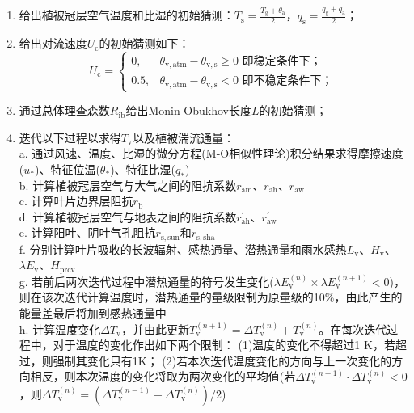 \begin{enumerate}
  \item 给出植被冠层空气温度和比湿的初始猜测：$T_{\mathrm {s}}=\frac{T_{\mathrm {g}} +\theta_{\mathrm{a}}}{2}$，$q_{\mathrm {s}}=\frac{q_{\mathrm {g}} +q_{\mathrm{a}}}{2}$；
  \item 给出对流速度$U_{\mathrm c}$的初始猜测如下：\\
    \begin{equation*}
      U_{\mathrm c}= \begin{cases}
        0,  & \theta_{\mathrm{v,atm}}-\theta_{\mathrm{v,s}}\geqslant0 \text{ 即稳定条件下；} \\
        0.5, & \theta_{\mathrm{v,atm}}-\theta_{\mathrm{v,s}}<0 \text{ 即不稳定条件下；}
      \end{cases}
    \end{equation*}
  \item 通过总体理查森数$R_{\mathrm{ib}}$给出Monin-Obukhov长度$L$的初始猜测；
  \item 迭代以下过程以求得$T_{\mathrm v}$以及植被湍流通量：\\
    a. 通过风速、温度、比湿的微分方程(M-O相似性理论)积分结果求得摩擦速度($u_\ast$)、特征位温($\theta_\ast$)、特征比湿($q_\ast$) \\
    b. 计算植被冠层空气与大气之间的阻抗系数$r_{\mathrm{am}}$、$r_{\mathrm{ah}}$、$r_{\mathrm{aw}}$ \\
    c. 计算叶片边界层阻抗$r_{\mathrm b}$ \\
    d. 计算植被冠层空气与地表之间的阻抗系数$r_{\mathrm{ah}}^\prime$、$r_{\mathrm{aw}}^\prime$ \\
    e. 计算阳叶、阴叶气孔阻抗$r_{\mathrm{s,sun}}$和$r_{\mathrm{s,sha}}$ \\
    f. 分别计算叶片吸收的长波辐射、感热通量、潜热通量和雨水感热$L_{\mathrm v}$、$H_{\mathrm{v}}$、$\lambda E_{\mathrm{v}}$、$H_{\mathrm{prcv}}$ \\
    g. 若前后两次迭代过程中潜热通量的符号发生变化($\lambda E_{\mathrm{v}}^{\left(n\right)}\times\lambda E_{\mathrm{v}}^{\left(n+1\right)}<0$)，
    则在该次迭代计算温度时，潜热通量的量级限制为原量级的10\%，由此产生的能量差最后将加到感热通量中 \\
    h. 计算温度变化$\Delta T_{\mathrm v}$，并由此更新$T_{\mathrm v}^{\left(n+1\right)}=\Delta T_{\mathrm v}^{\left(n\right)}+T_{\mathrm v}^{\left(n\right)}$。在每次迭代过程中，对于温度的变化作出如下两个限制：
    (1)温度的变化不得超过1 K，若超过，则强制其变化只有1K；
    (2)若本次迭代温度变化的方向与上一次变化的方向相反，则本次温度的变化将取为两次变化的平均值(若$\Delta T_{\mathrm v}^{\left(n-1\right)} \cdot \Delta T_{\mathrm v}^{\left(n\right)}<0$，则$\Delta T_{\mathrm v}^{\left(n\right)}=\left(\Delta T_{\mathrm v}^{\left(n-1\right)}+\Delta T_{\mathrm v}^{\left(n\right)}\right)/2$)\\

\end{enumerate}
